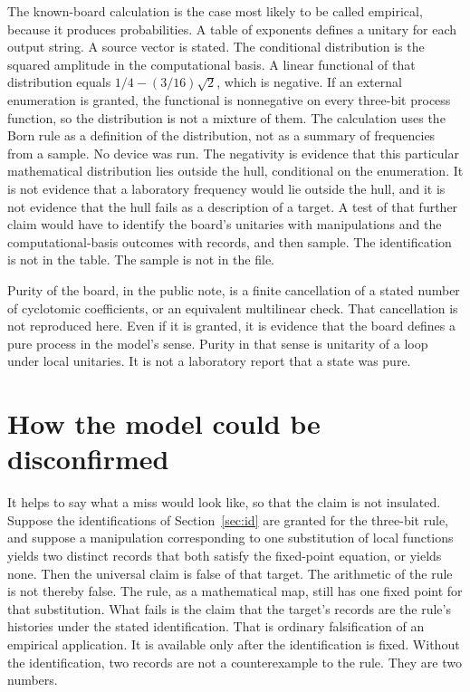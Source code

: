 \documentclass[11pt]{article}
\begin{document}
The known-board calculation is the case most likely to be called empirical, because it produces probabilities. A table of exponents defines a unitary for each output string. A source vector is stated. The conditional distribution is the squared amplitude in the computational basis. A linear functional of that distribution equals \(1/4-(3/16)\sqrt{2}\), which is negative. If an external enumeration is granted, the functional is nonnegative on every three-bit process function, so the distribution is not a mixture of them. The calculation uses the Born rule as a definition of the distribution, not as a summary of frequencies from a sample. No device was run. The negativity is evidence that this particular mathematical distribution lies outside the hull, conditional on the enumeration. It is not evidence that a laboratory frequency would lie outside the hull, and it is not evidence that the hull fails as a description of a target. A test of that further claim would have to identify the board's unitaries with manipulations and the computational-basis outcomes with records, and then sample. The identification is not in the table. The sample is not in the file.

Purity of the board, in the public note, is a finite cancellation of a stated number of cyclotomic coefficients, or an equivalent multilinear check. That cancellation is not reproduced here. Even if it is granted, it is evidence that the board defines a pure process in the model's sense. Purity in that sense is unitarity of a loop under local unitaries. It is not a laboratory report that a state was pure.

\section{How the model could be disconfirmed}
\label{sec:dis}

It helps to say what a miss would look like, so that the claim is not insulated. Suppose the identifications of Section~\ref{sec:id} are granted for the three-bit rule, and suppose a manipulation corresponding to one substitution of local functions yields two distinct records that both satisfy the fixed-point equation, or yields none. Then the universal claim is false of that target. The arithmetic of the rule is not thereby false. The rule, as a mathematical map, still has one fixed point for that substitution. What fails is the claim that the target's records are the rule's histories under the stated identification. That is ordinary falsification of an empirical application. It is available only after the identification is fixed. Without the identification, two records are not a counterexample to the rule. They are two numbers.
\end{document}
